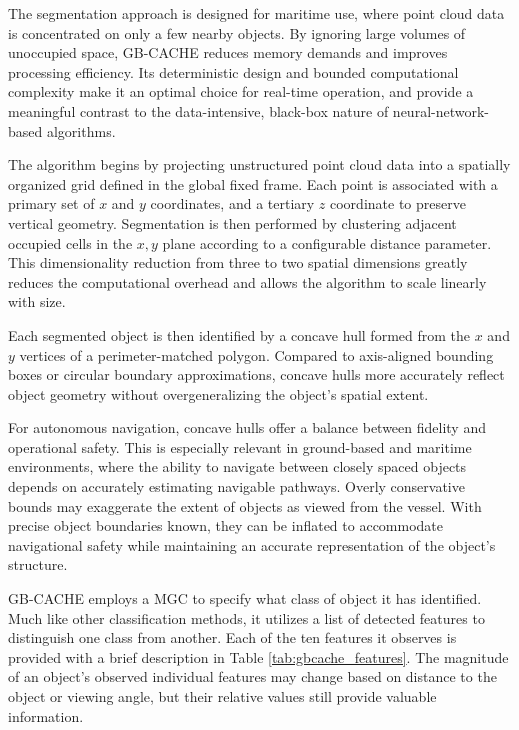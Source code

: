 \documentclass{erauthesis}
\begin{document}
The segmentation approach is designed for maritime use, where point cloud data is concentrated on only a few nearby objects.
By ignoring large volumes of unoccupied space, GB-CACHE reduces memory demands and improves processing efficiency.
Its deterministic design and bounded computational complexity make it an optimal choice for real-time operation, and provide a meaningful contrast to the data-intensive, black-box nature of neural-network-based algorithms.

The algorithm begins by projecting unstructured point cloud data into a spatially organized grid defined in the global fixed frame.
Each point is associated with a primary set of $x$ and $y$ coordinates, and a tertiary $z$ coordinate to preserve vertical geometry.
Segmentation is then performed by clustering adjacent occupied cells in the $x,y$ plane according to a configurable distance parameter.
This dimensionality reduction from three to two spatial dimensions greatly reduces the computational overhead and allows the algorithm to scale linearly with size.


Each segmented object is then identified by a concave hull formed from the $x$ and $y$ vertices of a perimeter-matched polygon.
Compared to axis-aligned bounding boxes or circular boundary approximations, concave hulls more accurately reflect object geometry without overgeneralizing the object’s spatial extent.

For autonomous navigation, concave hulls offer a balance between fidelity and operational safety.
This is especially relevant in ground-based and maritime environments, where the ability to navigate between closely spaced objects depends on accurately estimating navigable pathways.
Overly conservative bounds may exaggerate the extent of objects as viewed from the vessel.
With precise object boundaries known, they can be inflated to accommodate navigational safety while maintaining an accurate representation of the object's structure.

GB-CACHE employs a \acl{MGC} to specify what class of object it has identified. 
Much like other classification methods, it utilizes a list of detected features to distinguish one class from another.
Each of the ten features it observes is provided with a brief description in Table \ref{tab:gbcache_features}.
The magnitude of an object's observed individual features may change based on distance to the object or viewing angle, but their relative values still provide valuable information.
\end{document}
